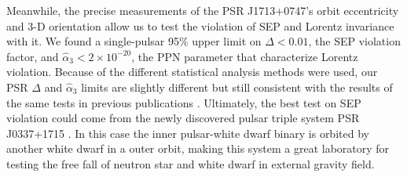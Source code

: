 
Meanwhile, the precise measurements of the PSR J1713+0747's orbit eccentricity and
3-D orientation allow us to test the violation of SEP and 
Lorentz invariance with it. We found a single-pulsar 95\% upper limit on 
$\Delta <0.01$, the SEP violation factor, and
$\hat{\alpha}_3<2\times10^{-20}$, the PPN parameter that characterize Lorentz
violation. 
Because of the different statistical analysis methods were used, our PSR
$\Delta$ and $\hat{\alpha}_3$ limits  are slightly
different but still consistent with the results of the same tests in previous publications 
\citep{wex00, sns+05, sfl+05, gsf+11}.
Ultimately, the best test on SEP violation could come from the newly
discovered pulsar triple system PSR J0337+1715 \citep{rsa+14}. In this case 
the inner pulsar-white dwarf binary is orbited by another white dwarf in a
outer orbit, making this system a great laboratory for testing
the free fall of neutron star and white dwarf in external gravity field.

